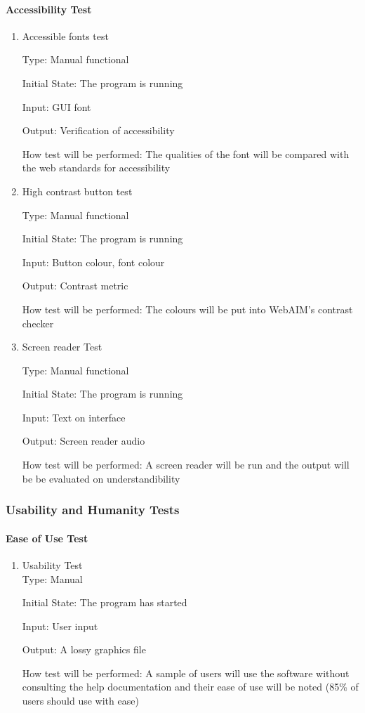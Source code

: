 \documentclass[12pt, titlepage]{article}
\begin{document}
\paragraph{Accessibility Test}
\begin{enumerate}

    \item {Accessible fonts test }

Type: Manual functional

Initial State: The program is running

Input: GUI font

Output: Verification of accessibility

How test will be performed: The qualities of the font will be compared with the web standards for accessibility
    \item {High contrast button test}

Type: Manual functional

Initial State: The program is running

Input: Button colour, font colour

Output: Contrast metric

How test will be performed: The colours will be put into WebAIM's contrast checker
    \item{Screen reader Test}

    Type: Manual functional

Initial State: The program is running

Input: Text on interface

Output: Screen reader audio

How test will be performed: A screen reader will be run and the output will be be evaluated on understandibility
\end{enumerate}
\subsubsection{Usability and Humanity Tests}
\paragraph{Ease of Use Test}
\begin{enumerate}
    \item{Usability Test\\}
    Type: Manual

Initial State: The program has started

Input: User input

Output: A lossy graphics file

How test will be performed: A sample of users will use the software without consulting the help documentation and their ease of use will be noted (85\% of users should use with ease)
\end{enumerate}
\end{document}
